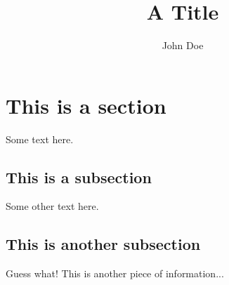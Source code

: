 \documentclass{article}
\title{A Title}
\author{John Doe}
\begin{document}
\maketitle

\section{This is a section}

Some text here.

\subsection{This is a subsection}

Some other text here.

\subsection{This is another subsection}

Guess what!
This is another piece of information...
\end{document}
